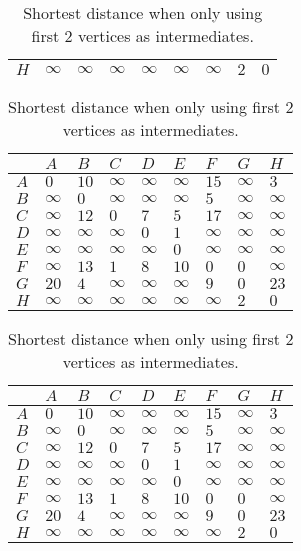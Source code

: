 \begin{solution}
\begin{table}[H]
\begin{tabular}{|l|l|l|l|l|l|l|l|l|}
$H$    & $\infty$ & $\infty$ & $\infty$ & $\infty$ & $\infty$ & $\infty$ & $2$ & $0$ \\ \hline
\end{tabular}
\caption{Shortest distance when only using first $2$ vertices as intermediates.}
\end{table}
\begin{table}[H]
    \centering
\begin{tabular}{|l|l|l|l|l|l|l|l|l|}
\hline
 & $A$ & $B$ & $C$ & $D$ & $E$ & $F$ & $G$ & $H$ \\ \hline
$A$ & $0$ & $10$ & $\infty$ & $\infty$ & $\infty$ & $15$ & $\infty$ & $3$ \\ \hline
$B$    & $\infty$ & $0$ & $\infty$ & $\infty$ & $\infty$ & $5$ & $\infty$ & $\infty$ \\ \hline
$C$    & $\infty$ & $12$ & $0$ & $7$ & $5$ & $17$ & $\infty$ & $\infty$ \\ \hline
$D$    & $\infty$ & $\infty$ & $\infty$ & $0$ & $1$ & $\infty$ & $\infty$ & $\infty$ \\ \hline
$E$    & $\infty$ & $\infty$ & $\infty$ & $\infty$ & $0$ & $\infty$ & $\infty$ & $\infty$ \\ \hline
$F$    & $\infty$ & $13$ & $1$ & $8$ & $10$ & $0$ & $0$ & $\infty$ \\ \hline
$G$    & $20$ & $4$ & $\infty$ & $\infty$ & $\infty$ & $9$ & $0$ & $23$ \\ \hline
$H$    & $\infty$ & $\infty$ & $\infty$ & $\infty$ & $\infty$ & $\infty$ & $2$ & $0$ \\ \hline
\end{tabular}
\caption{Shortest distance when only using first $2$ vertices as intermediates.}
\end{table}
\begin{table}[H]
    \centering
\begin{tabular}{|l|l|l|l|l|l|l|l|l|}
\hline
 & $A$ & $B$ & $C$ & $D$ & $E$ & $F$ & $G$ & $H$ \\ \hline
$A$ & $0$ & $10$ & $\infty$ & $\infty$ & $\infty$ & $15$ & $\infty$ & $3$ \\ \hline
$B$    & $\infty$ & $0$ & $\infty$ & $\infty$ & $\infty$ & $5$ & $\infty$ & $\infty$ \\ \hline
$C$    & $\infty$ & $12$ & $0$ & $7$ & $5$ & $17$ & $\infty$ & $\infty$ \\ \hline
$D$    & $\infty$ & $\infty$ & $\infty$ & $0$ & $1$ & $\infty$ & $\infty$ & $\infty$ \\ \hline
$E$    & $\infty$ & $\infty$ & $\infty$ & $\infty$ & $0$ & $\infty$ & $\infty$ & $\infty$ \\ \hline
$F$    & $\infty$ & $13$ & $1$ & $8$ & $10$ & $0$ & $0$ & $\infty$ \\ \hline
$G$    & $20$ & $4$ & $\infty$ & $\infty$ & $\infty$ & $9$ & $0$ & $23$ \\ \hline
$H$    & $\infty$ & $\infty$ & $\infty$ & $\infty$ & $\infty$ & $\infty$ & $2$ & $0$ \\ \hline
\end{tabular}
\caption{Shortest distance when only using first $2$ vertices as intermediates.}
\end{table}
\end{solution}
